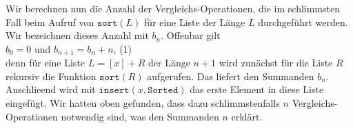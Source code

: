 Wir berechnen nun die Anzahl der
Vergleichs-Operationen, die im schlimmsten Fall beim Aufruf von $\texttt{sort}(L)$ f\"ur
eine Liste der L\"ange $L$ durchgef\"uhrt werden.  Wir bezeichnen dieses Anzahl mit $b_n$.
Offenbar gilt \\[0.2cm]
\hspace*{1.3cm} $b_0 = 0$ \quad und \quad $b_{n+1} = b_n + n$, \hspace*{\fill} (1)\\[0.2cm]
denn f\"ur eine Liste $L = [x] + R$ der L\"ange $n+1$ wird zun\"achst f\"ur die Liste $R$ rekursiv
die Funktion $\mathtt{sort}(R)$ aufgerufen. Das liefert den Summanden $b_n$. Anschlie\3end wird
mit $\mathtt{insert}(x, \mathtt{Sorted})$ 
das erste Element in diese Liste eingef\"ugt.  Wir hatten oben gefunden, dass dazu
schlimmstenfalls $n$
Vergleichs-Operationen notwendig sind, was den Summanden $n$ erkl\"art.

